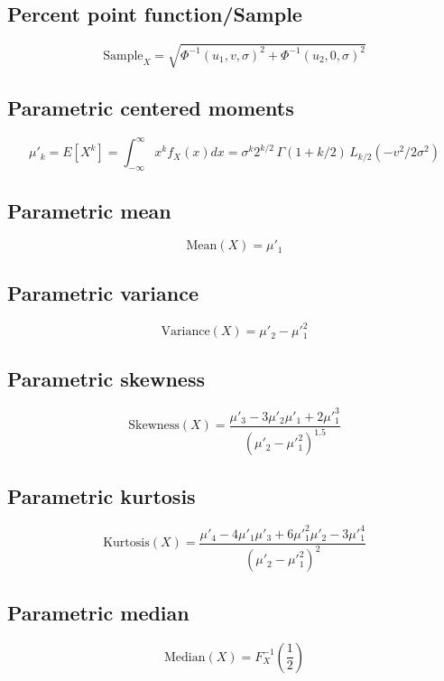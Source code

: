 \documentclass{article}
\begin{document}
\subsection{Percent point function/Sample}
\begin{equation*} \text{Sample}_{X}=\sqrt{\Phi^{-1}(u_{1},v,\sigma)^{2}+\Phi^{-1}(u_{2},0,\sigma)^{2}} \end{equation*}
\subsection{Parametric centered moments}
\begin{equation*} \mu'_{k}=E[X^k]=\int_{-\infty }^{\infty }x^{k}f_{X}\left(x\right)dx=\sigma^k2^{k/2}\,\Gamma(1+k/2)\,L_{k/2}(-v^2/2\sigma^2) \end{equation*}
\subsection{Parametric mean}
\begin{equation*} \mathrm{Mean}(X)=\mu'_{1} \end{equation*}
\subsection{Parametric variance}
\begin{equation*} \mathrm{Variance}(X)=\mu'_{2}-\mu'^{2}_{1} \end{equation*}
\subsection{Parametric skewness}
\begin{equation*} \mathrm{Skewness}(X)=\frac{\mu'_{3}-3\mu'_{2}\mu'_{1}+2\mu'^{3}_{1}}{(\mu'_{2}-\mu'^{2}_{1})^{1.5}} \end{equation*}
\subsection{Parametric kurtosis}
\begin{equation*} \mathrm{Kurtosis}(X)=\frac{\mu'_{4}-4\mu'_{1}\mu'_{3}+6\mu'^{2}_{1}\mu'_{2}-3\mu'^{4}_{1}}{(\mu'_{2}-\mu'^{2}_{1})^{2}} \end{equation*}
\subsection{Parametric median}
\begin{equation*} \mathrm{Median}(X)=F^{-1}_{X}\left(\frac{1}{2}\right) \end{equation*}
\end{document}
